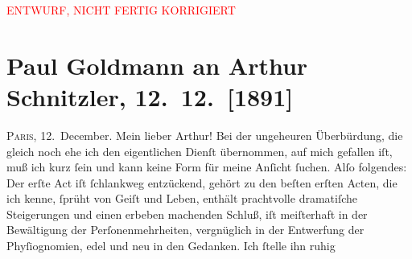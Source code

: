 
\begin{center}
            \textcolor{red}{ENTWURF, NICHT FERTIG KORRIGIERT}
                      \end{center}
            
               \section[Paul Goldmann an Arthur Schnitzler, 12. 12. {[}1891{]}]{ Paul Goldmann an Arthur Schnitzler, 12. 12. {[}1891{]}}\nopagebreak{}\rehead{ }\begin{ledgroupsized}[t]{13cm}\normalsize\beginnumbering{} \toendnotes[C]{\smallbreak\pagebreak[2]} 
\toendnotes[C]{\smallbreak}\pstart
           \raggedleft{}{\pb}\textsc{Paris}, 12. December.\pend
           \pstart\center{}Mein lieber Arthur!\pend\pstart
           Bei der ungeheuren Überbürdung, die gleich noch ehe ich den eigentlichen Dienſt
               übernommen, auf mich gefallen iſt, muß ich kurz ſein und kann keine Form für meine
               Anſicht ſuchen. Alſo folgendes: Der erſte Act iſt ſchlankweg entzückend, gehört zu den beſten erſten
               Acten, die ich kenne, ſprüht von Geiſt und Leben, enthält prachtvolle dramatiſche
               Steigerungen und einen  erbeben machenden Schluß,
               iſt meiſterhaft in der Bewältigung der Perſonenmehrheiten, vergnüglich in der
               Entwerfung der Phyſiognomien, edel und neu in den Gedanken. Ich ſtelle ihn ruhig

\end{ledgroupsized}
